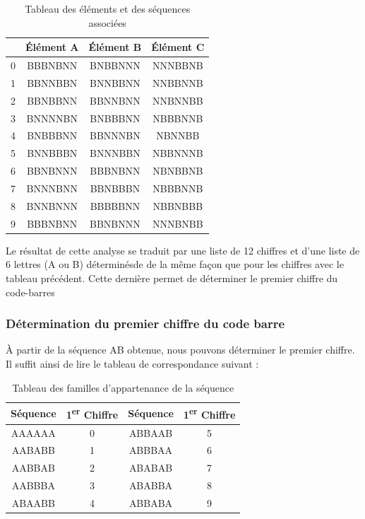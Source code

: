 \documentclass{rapport}
\begin{document}
\begin{table}[h!]
    \centering
    \renewcommand{\arraystretch}{1.5} %
    \begin{tabular}{|c|c|c|c|}
        \hline
        & \textbf{Élément A} & \textbf{Élément B} & \textbf{Élément C} \\ \hline
        0 & BBBNBNN & BNBBNNN & NNNBBNB \\ \hline
        1 & BBNNBBN & BNNBBNN & NNBBNNB \\ \hline
        2 & BBNBBNN & BBNNBNN & NNBNNBB \\ \hline
        3 & BNNNNBN & BNBBBNN & NBBBNNB \\ \hline
        4 & BNBBBNN & BBNNNBN & NBNNBB \\ \hline
        5 & BNNBBBN & BNNNBBN & NBBNNNB \\ \hline
        6 & BBNBNNN & BBBNBNN & NBNBBNB \\ \hline
        7 & BNNNBNN & BBNBBBN & NBBBNNB \\ \hline
        8 & BNNBNNN & BBBBBNN & NBBNBBB \\ \hline
        9 & BBBNBNN & BBNBNNN & NNNBNBB \\ \hline
    \end{tabular}
    \caption{Tableau des éléments et des séquences associées}
    \label{tab:elements}
\end{table}

Le résultat de cette analyse se traduit par une liste de 12 chiffres et d'une liste de 6 lettres (A ou B) déterminésde
de la même façon que pour les chiffres avec le tableau précédent. Cette dernière permet de déterminer le premier chiffre du code-barres

\subsubsection*{Détermination du premier chiffre du code barre}

À partir de la séquence AB obtenue, nous pouvons déterminer le premier chiffre. 
Il suffit ainsi de lire le tableau de correspondance suivant :

\begin{table}[h!]
    \centering
    \renewcommand{\arraystretch}{1.5} %
    \begin{tabular}{|c|c|c|c|}
        \hline
        \textbf{Séquence} & \textbf{1\textsuperscript{er} Chiffre} & \textbf{Séquence} & \textbf{1\textsuperscript{er} Chiffre} \\ \hline
        AAAAAA & 0 & ABBAAB & 5 \\ \hline
        AABABB & 1 & ABBBAA & 6 \\ \hline
        AABBAB & 2 & ABABAB & 7 \\ \hline
        AABBBA & 3 & ABABBA & 8 \\ \hline
        ABAABB & 4 & ABBABA & 9 \\ \hline
    \end{tabular}
    \caption{Tableau des familles d’appartenance de la séquence}
    \label{tab:sequence}
\end{table}
\end{document}
